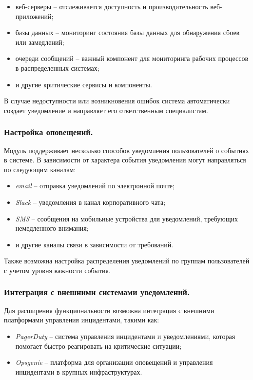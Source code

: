 \begin{itemize}
    \item веб-серверы -- отслеживается доступность и производительность веб-приложений;
    \item базы данных -- мониторинг состояния базы данных для обнаружения сбоев или замедлений;
    \item очереди сообщений -- важный компонент для мониторинга рабочих процессов в распределенных системах;
    \item и другие критические сервисы и компоненты.
\end{itemize}

В случае недоступности или возникновения ошибок система автоматически создает уведомление и направляет его ответственным специалистам.

\subsubsection{Настройка оповещений.}  
Модуль поддерживает несколько способов уведомления пользователей о событиях в системе. В зависимости от характера события уведомления могут направляться по следующим каналам:

\begin{itemize}
    \item \textit{email} -- отправка уведомлений по электронной почте;
    \item \textit{Slack} -- уведомления в канал корпоративного чата;
    \item \textit{SMS} -- сообщения на мобильные устройства для уведомлений, требующих немедленного внимания;
    \item и другие каналы связи в зависимости от требований.
\end{itemize}

Также возможна настройка распределения уведомлений по группам пользователей с учетом уровня важности события.

\subsubsection{Интеграция с внешними системами уведомлений.}  
Для расширения функциональности возможна интеграция с внешними платформами управления инцидентами, такими как:

\begin{itemize}
    \item \textit{PagerDuty} -- система управления инцидентами и уведомлениями, которая помогает быстро реагировать на критические ситуации;
    \item \textit{Opsgenie} -- платформа для организации оповещений и управления инцидентами в крупных инфраструктурах.
\end{itemize}

